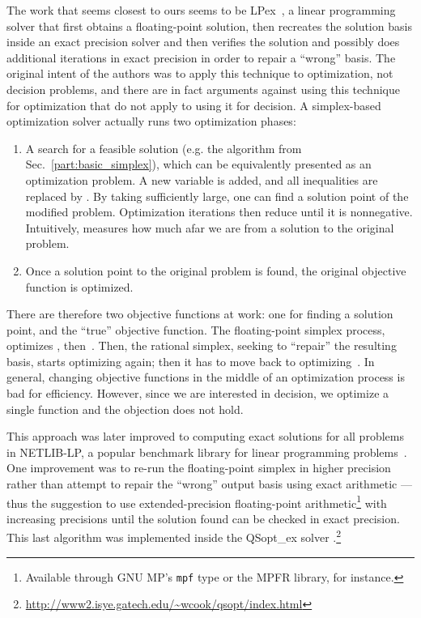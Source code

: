 The work that seems closest to ours seems to be LPex~\cite{Dihflaoui_et_al_SODA03}, a linear programming solver that first obtains a floating-point solution, then recreates the solution basis inside an exact precision solver and then verifies the solution and possibly does additional iterations in exact precision in order to repair a ``wrong'' basis. The original intent of the authors was to apply this technique to optimization, not decision problems, and there are in fact arguments against using this technique for optimization that do not apply to using it for decision. A simplex-based optimization solver actually runs two optimization phases:
\begin{enumerate}
\item A search for a feasible solution (e.g. the algorithm from Sec.~\ref{part:basic_simplex}), which can be equivalently presented as an optimization problem. A new variable  is added, and all inequalities  are replaced by . By taking  sufficiently large, one can find a solution point of the modified problem. Optimization iterations then reduce  until it is nonnegative. Intuitively,  measures how much afar we are from a solution to the original problem.

\item Once a solution point to the original problem is found, the original objective function  is optimized.
\end{enumerate}
There are therefore two objective functions at work: one for finding a solution point, and the ``true'' objective function. The floating-point simplex process, optimizes , then~. Then, the rational simplex, seeking to ``repair'' the resulting basis, starts optimizing  again; then it has to move back to optimizing~. In general, changing objective functions in the middle of an optimization process is bad for efficiency. However, since we are interested in decision, we optimize a single function and the objection does not hold.

This approach was later improved to computing exact solutions for all problems in NETLIB-LP, a popular benchmark library for linear programming problems~\cite{Koch_thefinal_ORL04}. One improvement was to re-run the floating-point simplex in higher precision rather than attempt to repair the ``wrong'' output basis using exact arithmetic --- thus the suggestion to use extended-precision floating-point arithmetic\footnote{Available through GNU MP's \texttt{mpf} type or the MPFR library, for instance.}
with increasing precisions until the solution found can be checked in exact precision. This last algorithm was implemented inside the QSopt\_ex solver \cite{DBLP:journals/orl/ApplegateCDE07}.\footnote{\url{http://www2.isye.gatech.edu/~wcook/qsopt/index.html}}


